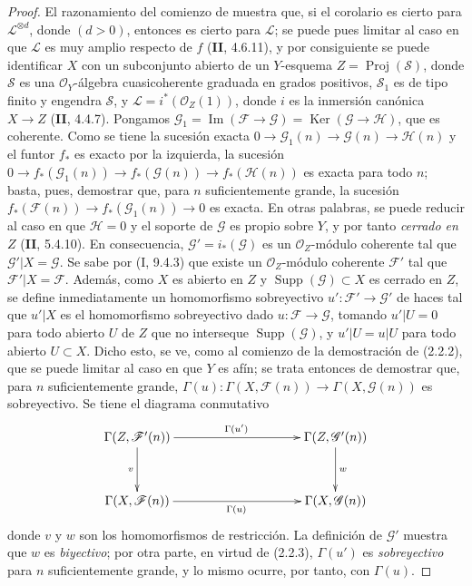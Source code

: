 \begin{proof}
El razonamiento del comienzo de  muestra que, si el corolario es cierto para $\mathcal L^{\otimes d}$, donde $(d>0)$, entonces es cierto para $\mathcal L$; se puede pues limitar al caso en que $\mathcal L$ es muy amplio respecto de $f$ (\textbf{II}, 4.6.11), y por consiguiente se puede identificar $X$ con un subconjunto abierto de un $Y$-esquema
$Z=\operatorname{Proj}(\mathcal S)$,
donde $\mathcal S$ es una $\mathcal O_Y$-álgebra cuasicoherente graduada en grados positivos, $\mathcal S_1$ es de tipo finito y engendra $\mathcal S$, y
$\mathcal L=i^*(\mathcal O_Z(1))$, donde $i$ es la inmersión
canónica $X\to Z$ (\textbf{II}, 4.4.7). Pongamos
$\mathcal G_1=\operatorname{Im}(\mathcal F\to\mathcal G)
=\operatorname{Ker}(\mathcal G\to\mathcal H)$,
que es coherente. Como se tiene la sucesión exacta
$0\to\mathcal G_1(n)\to\mathcal G(n)\to\mathcal H(n)$
y el funtor $f_*$ es exacto por la izquierda, la sucesión
$0\to f_*(\mathcal G_1(n))\to f_*(\mathcal G(n))\to f_*(\mathcal H(n))$
es exacta para todo $n$; basta, pues, demostrar que, para $n$ suficientemente grande, la sucesión
$f_*(\mathcal F(n))\to f_*(\mathcal G_1(n))\to0$
es exacta. En otras palabras, se puede reducir al caso en que $\mathcal H=0$ y el soporte de $\mathcal G$ es propio sobre $Y$, y por tanto \emph{cerrado en $Z$} (\textbf{II}, 5.4.10). En consecuencia, $\mathcal G'=i_*(\mathcal G)$ es un $\mathcal O_Z$-módulo coherente tal que $\mathcal G'|X=\mathcal G$. Se sabe por (I, 9.4.3) que existe un $\mathcal O_Z$-módulo coherente $\mathcal F'$ tal que $\mathcal F'|X=\mathcal F$. Además, como $X$ es abierto en $Z$ y $\operatorname{Supp}(\mathcal G)\subset X$ es cerrado en $Z$, se define inmediatamente un homomorfismo sobreyectivo $u':\mathcal F'\to\mathcal G'$ de
haces tal que $u'|X$ es el homomorfismo sobreyectivo dado
$u:\mathcal F\to\mathcal G$, tomando $u'|U=0$ para todo abierto $U$ de $Z$ que no interseque $\operatorname{Supp}(\mathcal G)$, y $u'|U=u|U$ para todo abierto $U\subset X$. Dicho esto, se ve, como al comienzo de la demostración de (2.2.2), que se puede limitar al caso en que $Y$ es afín; se trata entonces de demostrar que, para $n$ suficientemente grande,
$\Gamma(u):\Gamma(X,\mathcal F(n))\to\Gamma(X,\mathcal G(n))$
es sobreyectivo. Se tiene el diagrama conmutativo
\[
\xymatrix@C=35mm@R=12mm{
\Gamma(Z,\mathcal F'(n)) \ar[r]^{\Gamma(u')} \ar[d]_v &
\Gamma(Z,\mathcal G'(n)) \ar[d]^w \\
\Gamma(X,\mathcal F(n)) \ar[r]_{\Gamma(u)} & \Gamma(X,\mathcal G(n))
}
\]
donde $v$ y $w$ son los homomorfismos de restricción. La definición de
$\mathcal G'$ muestra que $w$ es \emph{biyectivo}; por otra parte, en virtud de (2.2.3), $\Gamma(u')$ es \emph{sobreyectivo} para $n$ suficientemente grande, y lo mismo ocurre, por tanto, con $\Gamma(u)$.
\end{proof}

